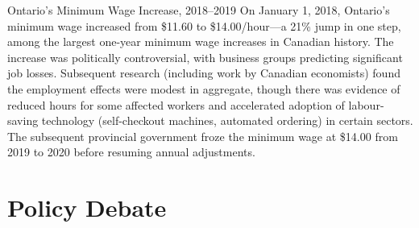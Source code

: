 \begin{canexample}{Ontario's Minimum Wage Increase, 2018--2019}
On January 1, 2018, Ontario's minimum wage increased from \$11.60 to \$14.00/hour---a
21\% jump in one step, among the largest one-year minimum wage increases in Canadian
history. The increase was politically controversial, with business groups predicting
significant job losses. Subsequent research (including work by Canadian economists)
found the employment effects were modest in aggregate, though there was evidence of
reduced hours for some affected workers and accelerated adoption of labour-saving
technology (self-checkout machines, automated ordering) in certain sectors.
The subsequent provincial government froze the minimum wage at \$14.00 from 2019 to 2020
before resuming annual adjustments.
\end{canexample}

\section{Policy Debate}

